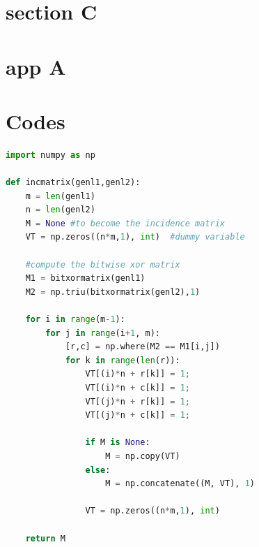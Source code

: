 \appendix
\section{section C}
\lipsum[13]

\section{app A}
\lipsum[14-15]

\section{Codes}
\begin{mdframed}
    \begin{lstlisting}[language=Python]
import numpy as np

def incmatrix(genl1,genl2):
    m = len(genl1)
    n = len(genl2)
    M = None #to become the incidence matrix
    VT = np.zeros((n*m,1), int)  #dummy variable

    #compute the bitwise xor matrix
    M1 = bitxormatrix(genl1)
    M2 = np.triu(bitxormatrix(genl2),1)

    for i in range(m-1):
        for j in range(i+1, m):
            [r,c] = np.where(M2 == M1[i,j])
            for k in range(len(r)):
                VT[(i)*n + r[k]] = 1;
                VT[(i)*n + c[k]] = 1;
                VT[(j)*n + r[k]] = 1;
                VT[(j)*n + c[k]] = 1;

                if M is None:
                    M = np.copy(VT)
                else:
                    M = np.concatenate((M, VT), 1)

                VT = np.zeros((n*m,1), int)

    return M
\end{lstlisting}
\end{mdframed}


